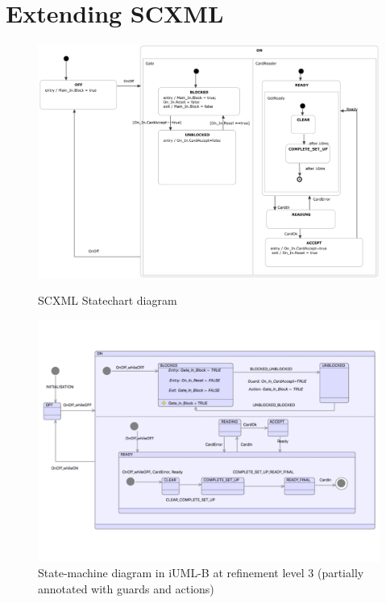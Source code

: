 
\section{Extending SCXML}
\label{sect:extension}

\begin{figure}
\begin{minipage}[]{.5\textwidth}
  \includegraphics[width=1\textwidth]{caseStudy/TurnstileSimpleModel2.png}
  \caption{SCXML Statechart diagram}
  \label{fig:StatemachineSCXML}
\end{minipage}
\begin{minipage}[]{.5\textwidth}
  \includegraphics[width=1\textwidth]{caseStudy/TurnstileSimpleModel_iumlb}
  \caption{State-machine diagram in iUML-B at refinement level 3 (partially annotated with guards and actions)}
  \label{fig:StatemachineiUML-B}
\end{minipage}
\end{figure}

